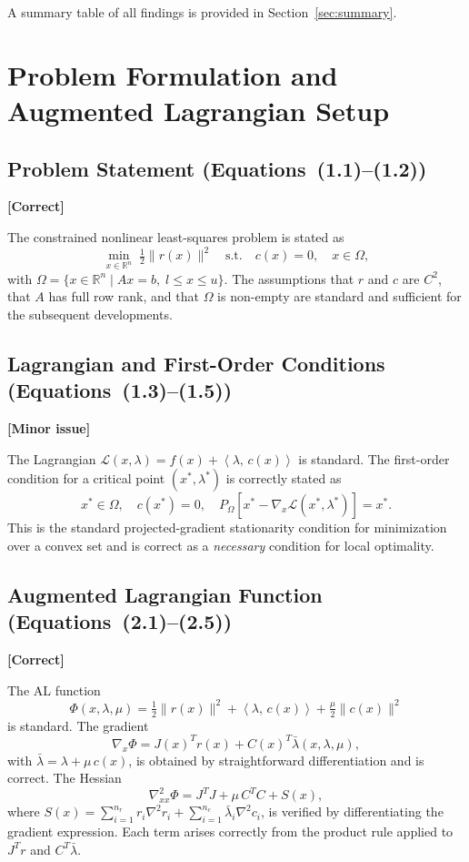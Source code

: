 \documentclass[11pt]{article}
\newcommand{\RR}{\mathbb{R}}
\newcommand{\inner}[2]{\left\langle #1,\, #2 \right\rangle}
\newcommand{\proj}[2]{P_{#1}\!\left[#2\right]}
\newcommand{\statusok}{\textcolor{okcolor}{\textbf{[Correct]}}}
\newcommand{\statuswarn}{\textcolor{warncolor}{\textbf{[Minor issue]}}}
\theoremstyle{plain}
\begin{document}
A summary table of all findings is provided in Section~\ref{sec:summary}.

\section{Problem Formulation and Augmented Lagrangian Setup}

\subsection{Problem Statement (Equations~(1.1)--(1.2))}
\statusok

The constrained nonlinear least-squares problem is stated as
\[
\min_{x\in\RR^n} \;\tfrac{1}{2}\|r(x)\|^2 \quad \text{s.t.}\quad c(x)=0,\quad x\in\Omega,
\]
with $\Omega = \{x \in \RR^n \mid Ax = b,\; l \le x \le u\}$. The assumptions that $r$ and $c$ are $C^2$, that $A$ has full row rank, and that $\Omega$ is non-empty are standard and sufficient for the subsequent developments.

\subsection{Lagrangian and First-Order Conditions (Equations~(1.3)--(1.5))}
\statuswarn

The Lagrangian $\mathcal{L}(x,\lambda) = f(x) + \inner{\lambda}{c(x)}$ is standard. The first-order condition for a critical point $(x^*,\lambda^*)$ is correctly stated as
\[
x^*\in\Omega,\quad c(x^*)=0,\quad \proj{\Omega}{x^*-\nabla_x\mathcal{L}(x^*,\lambda^*)}=x^*.
\]
This is the standard projected-gradient stationarity condition for minimization over a convex set and is correct as a \emph{necessary} condition for local optimality.

\subsection{Augmented Lagrangian Function (Equations~(2.1)--(2.5))}
\statusok

The AL function
\[
\Phi(x,\lambda,\mu) = \tfrac{1}{2}\|r(x)\|^2 + \inner{\lambda}{c(x)} + \tfrac{\mu}{2}\|c(x)\|^2
\]
is standard. The gradient
\[
\nabla_x\Phi = J(x)^Tr(x) + C(x)^T\bar{\lambda}(x,\lambda,\mu),
\]
with $\bar{\lambda} = \lambda + \mu\,c(x)$, is obtained by straightforward differentiation and is correct. The Hessian
\[
\nabla^2_{xx}\Phi = J^TJ + \mu\,C^TC + S(x),
\]
where $S(x) = \sum_{i=1}^{n_r} r_i\nabla^2 r_i + \sum_{i=1}^{n_c} \bar{\lambda}_i\nabla^2 c_i$, is verified by differentiating the gradient expression. Each term arises correctly from the product rule applied to $J^Tr$ and $C^T\bar{\lambda}$.
\end{document}
